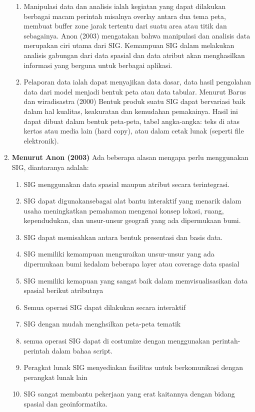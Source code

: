 \begin{enumerate}
\begin{enumerate}
\item Manipulasi data dan analisis ialah kegiatan yang dapat dilakukan berbagai macam perintah misalnya overlay antara dua tema peta, membuat buffer zone jarak tertentu dari suatu area atau titik dan sebagainya. Anon (2003) mengatakan bahwa manipulasi dan analisis data merupakan ciri utama dari SIG. Kemampuan SIG dalam melakukan analisis gabungan dari data spasial dan data atribut akan menghasilkan informasi yang berguna untuk berbagai aplikasi.

\item Pelaporan data ialah dapat menyajikan data dasar, data hasil pengolahan data dari model menjadi bentuk peta atau data tabular. Menurut Barus dan wiradisastra (2000) Bentuk produk suatu SIG dapat bervariasi baik dalam hal kualitas, keakuratan dan kemudahan pemakainya. Hasil ini dapat dibuat dalam bentuk peta-peta, tabel angka-angka: teks di atas kertas atau media lain (hard copy), atau dalam cetak lunak (seperti file elektronik).
\end{enumerate}

\item \textbf{Menurut Anon (2003)}
\subitem Ada beberapa alasan mengapa perlu menggunakan SIG, diantaranya adalah:
\begin{enumerate}
\item SIG menggunakan data spasial maupun atribut secara terintegrasi.
\item SIG dapat digunakansebagai alat bantu interaktif yang menarik dalam usaha meningkatkan pemahaman mengenai konsep lokasi, ruang, kependudukan, dan unsur-unsur geografi yang ada dipermukaan bumi.
\item SIG dapat memisahkan antara bentuk presentasi dan basis data.
\item SIG memiliki kemampuan menguraikan unsur-unsur yang ada dipermukaan bumi kedalam beberapa layer atau coverage data spasial
\item SIG memiliki kemapuan yang sangat baik dalam memvisualisasikan data spasial berikut atributnya
\item Semua operasi SIG dapat dilakukan secara interaktif
\item SIG dengan mudah menghsilkan peta-peta tematik
\item semua operasi SIG dapat di costumize dengan menggunakan perintah-perintah dalam bahaa script.
\item Peragkat lunak SIG menyediakan fasilitas untuk berkomunikasi dengan perangkat lunak lain
\item SIG sangat membantu pekerjaan yang erat kaitannya dengan bidang spasial dan geoinformatika.
\end{enumerate}


\end{enumerate}

